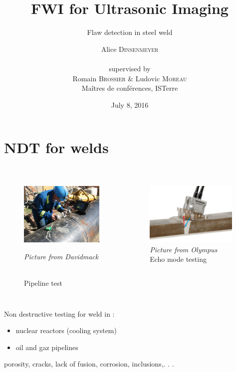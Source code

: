 \documentclass[10pt,xcolor=x11names,compress, notes=show]{beamer}%
\author{Alice \textsc{Dinsenmeyer} \\~\\ supervised by\\ Romain \textsc{Brossier} \& Ludovic \textsc{Moreau} \\ Maîtres de conférences, ISTerre}
\title{FWI for Ultrasonic Imaging}
\subtitle{Flaw detection in steel weld}
\date{July 8, 2016}
\begin{document}
\begin{frame}
	\titlepage 
\end{frame}


\section{NDT for welds}

\subsection*{}
\begin{frame}{\insertsectionhead}
\vspace{-0.7cm}
		\begin{columns}
			\centering
			\begin{figure}
				\includegraphics[height=3cm]{img/us_test.jpg}\\
				{\tiny{\raggedright \itshape Picture from Davidmack}\\ \centering \scriptsize{Pipeline test}}
			\end{figure}		
			\begin{figure}
				\includegraphics[height=3cm]{img/olympus.jpg}\\
				 {\tiny{\itshape Picture from Olympus}\\ \centering			\scriptsize{Echo mode testing}}
			\end{figure}
		\end{columns}	
		\vspace{0.6cm}	

			Non destructive testing for weld in :\\
			\begin{itemize}
				\item nuclear reactors (cooling system)
				\item oil and gaz pipelines 
			\end{itemize}
			\vspace{0.6cm}
 			\indent {} porosity, cracks, lack of fusion, corrosion, inclusions,. . .
\end{frame}
\end{document}
